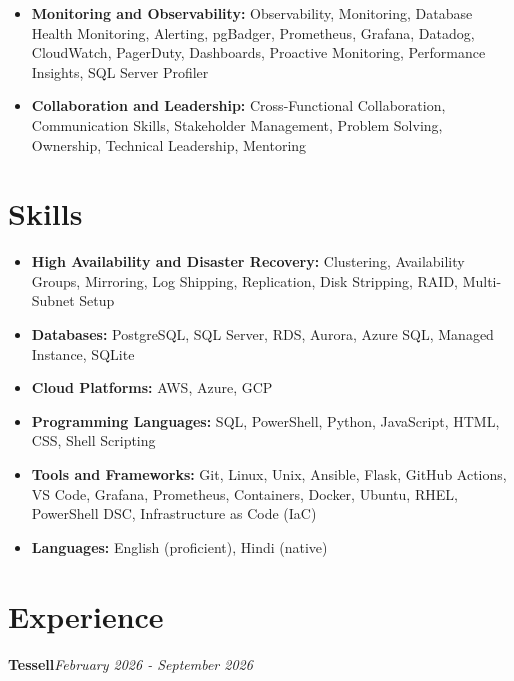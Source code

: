 \documentclass[10pt,a4paper]{article}
\begin{document}
\begin{itemize}
  \item \textbf{Monitoring and Observability:} Observability, Monitoring, Database Health Monitoring, Alerting, pgBadger, Prometheus, Grafana, Datadog, CloudWatch, PagerDuty, Dashboards, Proactive Monitoring, Performance Insights, SQL Server Profiler
  \item \textbf{Collaboration and Leadership:} Cross-Functional Collaboration, Communication Skills, Stakeholder Management, Problem Solving, Ownership, Technical Leadership, Mentoring
\end{itemize}

\section{Skills}
\begin{itemize}
  \item \textbf{High Availability and Disaster Recovery:} Clustering, Availability Groups, Mirroring, Log Shipping, Replication, Disk Stripping, RAID, Multi-Subnet Setup
  \item \textbf{Databases:} PostgreSQL, SQL Server, RDS, Aurora, Azure SQL, Managed Instance, SQLite
  \item \textbf{Cloud Platforms:} AWS, Azure, GCP
  \item \textbf{Programming Languages:} SQL, PowerShell, Python, JavaScript, HTML, CSS, Shell Scripting
  \item \textbf{Tools and Frameworks:} Git, Linux, Unix, Ansible, Flask, GitHub Actions, VS Code, Grafana, Prometheus, Containers, Docker, Ubuntu, RHEL, PowerShell DSC, Infrastructure as Code (IaC)
  \item \textbf{Languages:} English (proficient), Hindi (native)
\end{itemize}

\section{Experience}

\noindent\textbf{Tessell}\hfill \textit{February 2026 - September 2026}
\end{document}
